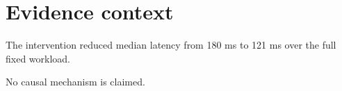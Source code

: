 \section{Evidence context}
The intervention reduced median latency from 180 ms to 121 ms over the full fixed workload.

No causal mechanism is claimed.

